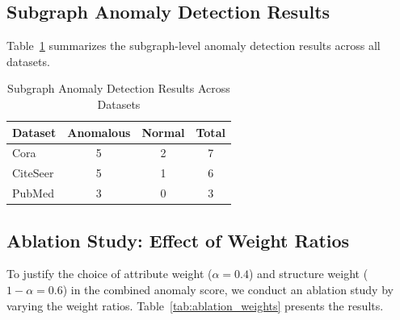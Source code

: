 \documentclass[10pt,twocolumn,a4paper]{article}
\begin{document}
\subsection{Subgraph Anomaly Detection Results}

Table~\ref{tab:anomaly_results} summarizes the subgraph-level anomaly detection results across all datasets.

\begin{table}[ht]
\centering
\caption{Subgraph Anomaly Detection Results Across Datasets}
\label{tab:anomaly_results}
\begin{tabular}{|l|c|c|c|}
\hline
\textbf{Dataset} & \textbf{Anomalous} & \textbf{Normal} & \textbf{Total} \\
\hline
Cora & 5 & 2 & 7 \\
\hline
CiteSeer & 5 & 1 & 6 \\
\hline
PubMed & 3 & 0 & 3 \\
\hline
\end{tabular}
\end{table}

\subsection{Ablation Study: Effect of Weight Ratios}

To justify the choice of attribute weight ($\alpha = 0.4$) and structure weight ($1 - \alpha = 0.6$) in the combined anomaly score, we conduct an ablation study by varying the weight ratios. Table~\ref{tab:ablation_weights} presents the results.

\begin{table}[ht]
\centering
\caption{Effect of Attribute/Structure Weight Ratios on Anomaly Detection}
\label{tab:ablation_weights}
\end{table}
\end{document}
